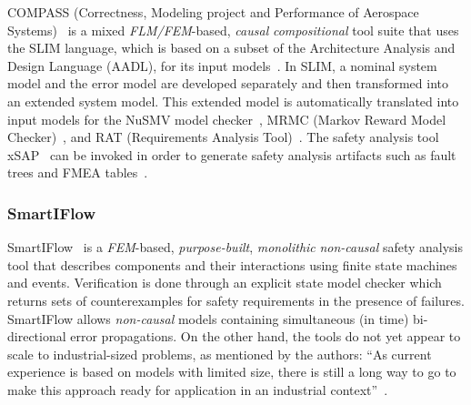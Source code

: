 COMPASS (Correctness, Modeling project and Performance of Aerospace Systems)~\cite{10.1007/978-3-642-04468-7_15} is a mixed {\em FLM/FEM}-based, {\em causal} {\em compositional} tool suite that uses the SLIM language, which is based on a subset of the Architecture Analysis and Design Language (AADL), for its input models~\cite{5185388, criticalembeddedsystems}. In SLIM, a nominal system model and the error model are developed separately and then transformed into an extended system model.  This extended model is automatically translated into input models for the NuSMV model checker~\cite{Cimatti2000, NuSMV}, MRMC (Markov Reward Model Checker)~\cite{Katoen:2005:MRM:1114692.1115230, MRMC}, and RAT (Requirements Analysis Tool)~\cite{RAT}. The safety analysis tool xSAP~\cite{DBLP:conf/tacas/BittnerBCCGGMMZ16} can be invoked in order to generate safety analysis artifacts such as fault trees and FMEA tables~\cite{compass30toolset}.  %

\subsubsection{SmartIFlow}
SmartIFlow~\cite{info17:HaLuHo,honig2014new} is a {\em FEM}-based, {\em purpose-built}, {\em monolithic} {\em non-causal} safety analysis tool that describes components and their interactions using finite state machines and events. Verification is done through an explicit state model checker which returns sets of counterexamples for safety requirements in the presence of failures.  SmartIFlow allows {\em non-causal} models containing simultaneous (in time) bi-directional error propagations.  On the other hand, the tools do not yet appear to scale to industrial-sized problems, as mentioned by the authors: ``As current experience is based on models with limited size, there is still a long way to go to make this approach ready for application in an industrial context''~\cite{info17:HaLuHo}.

